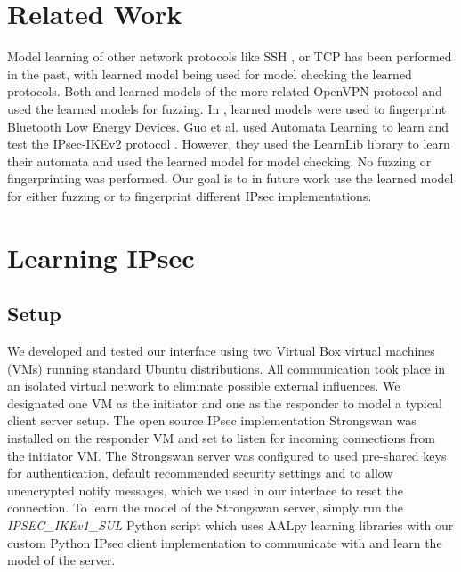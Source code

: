 \documentclass[runningheads]{llncs}
\begin{document}
\section{Related Work} \label{chap:3} %
Model learning of other network protocols like SSH \cite{fiteruau2017model}, or TCP \cite{fiteruau2016combining} has been performed in the past, with learned model being used for model checking the learned protocols. Both \cite{novickis2016protocol} and \cite{daniel2018inferring} learned models of the more related OpenVPN protocol \cite{novickis2016protocol} and used the learned models for fuzzing. In \cite{pferscher2021fingerprinting}, learned models were used to fingerprint Bluetooth Low Energy Devices. Guo et al. used Automata Learning to learn and test the IPsec-IKEv2 protocol \cite{guo2019model}. However, they used the LearnLib library to learn their automata and used the learned model for model checking. No fuzzing or fingerprinting was performed. Our goal is to in future work use the learned model for either fuzzing or to fingerprint different IPsec implementations.


\section{Learning IPsec} \label{chap:4} %
\subsection{Setup} %
We developed and tested our interface using two Virtual Box virtual machines (VMs) running standard Ubuntu distributions. All communication took place in an isolated virtual network to eliminate possible external influences. We designated one VM as the initiator and one as the responder to model a typical client server setup. The open source IPsec implementation Strongswan was installed on the responder VM and set to listen for incoming connections from the initiator VM. The Strongswan server was configured to used pre-shared keys for authentication, default recommended security settings and to allow unencrypted notify messages, which we used in our interface to reset the connection. To learn the model of the Strongswan server, simply run the \emph{IPSEC\_IKEv1\_SUL} Python script which uses AALpy learning libraries with our custom Python IPsec client implementation to communicate with and learn the model of the server.
\end{document}

